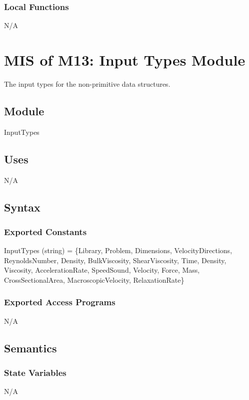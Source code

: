 \documentclass[12pt, titlepage]{article}
\begin{document}
\subsubsection{Local Functions}
N/A

\newpage

\section{MIS of M13: Input Types Module} \label{ITModule} 

The input types for the non-primitive data structures.

\subsection{Module}

InputTypes

\subsection{Uses}

N/A

\subsection{Syntax}

\subsubsection{Exported Constants}
InputTypes (string) = \{Library, Problem, Dimensions, VelocityDirections, ReynoldsNumber, Density, BulkViscosity, ShearViscosity, Time, Density, Viscosity, AccelerationRate, SpeedSound, Velocity, Force, Mass, CrossSectionalArea, MacroscopicVelocity, RelaxationRate\}
 
\subsubsection{Exported Access Programs}
N/A

\subsection{Semantics}

\subsubsection{State Variables}
N/A
\end{document}
